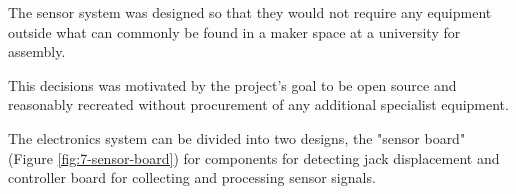 




The sensor system was designed so that they would not require any equipment outside what can commonly be found in a maker space at a university for assembly.



This decisions was motivated by the project's goal to be open source and reasonably recreated without procurement of any additional specialist equipment.


The electronics system can be divided into two designs, the "sensor board" (Figure \ref{fig:7-sensor-board}) for components for detecting jack displacement and controller board for collecting and processing sensor signals.

